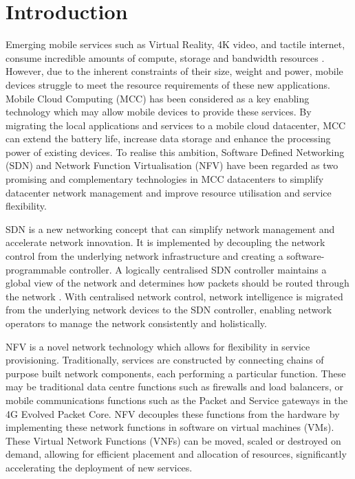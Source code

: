 
\section{Introduction}
\label{sec:introduction}

Emerging mobile services such as Virtual Reality, 4K video, and tactile internet, consume incredible amounts of compute, storage and bandwidth resources \cite{AndrewsBCHLSZ14}. However, due to the inherent constraints of their size, weight and power, mobile devices struggle to meet the resource requirements of these new applications. Mobile Cloud Computing (MCC) \cite{LiSHGXX18, RahimiVMV18} has been considered as a key enabling technology which may allow mobile devices to provide these services. By migrating the local applications and services to a mobile cloud datacenter, MCC can extend the battery life, increase data storage and enhance the processing power of existing devices. To realise this ambition, Software Defined Networking (SDN) and Network Function Virtualisation (NFV) have been regarded as two promising and complementary technologies in MCC datacenters to simplify datacenter network management and improve resource utilisation and service flexibility. 

SDN is a new networking concept that can simplify network management and accelerate network innovation. It is implemented by decoupling the network control from the underlying network infrastructure and creating a software-programmable controller. A logically centralised SDN controller maintains a global view of the network and determines how packets should be routed through the network \cite{KimF13, HaresW13}. With centralised network control, network intelligence is migrated from the underlying network devices to the SDN controller, enabling network operators to manage the network consistently and holistically. 

NFV is a novel network technology which allows for flexibility in service provisioning. Traditionally, services are constructed by connecting chains of purpose built network components, each performing a particular function. These may be traditional data centre functions such as firewalls and load balancers, or mobile communications functions such as the Packet and Service gateways in the 4G Evolved Packet Core. NFV decouples these functions from the hardware by implementing these network functions in software on virtual machines (VMs). These Virtual Network Functions (VNFs) can be moved, scaled or destroyed on demand, allowing for efficient placement and allocation of resources, significantly accelerating the deployment of new services. 

